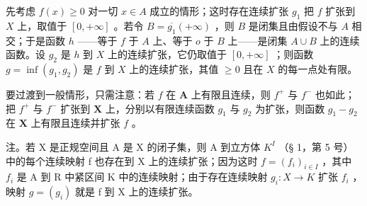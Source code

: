 先考虑 \(f(x) \geqslant 0\) 对一切 \(x \in A\) 成立的情形；这时存在连续扩张 \(g_1\) 把 \(f\) 扩张到 \(X\) 上，取值于 \([0, +\infty]\) 。若令 \(B = \overline{g_1} (+\infty)\) ，则 \(B\) 是闭集且由假设不与 \(A\) 相交；于是函数 \(h\) ——等于 \(f\) 于 \(A\) 上、等于 \(o\) 于 \(B\) 上——是闭集 \(A \cup B\) 上的连续函数。设 \(g_2\) 是 \(h\) 到 \(X\) 上的连续扩张，它仍取值于 \([0, +\infty]\) ；则函数 \(g = \inf(g_1, g_2)\) 是 \(f\) 到 \(X\) 上的连续扩张，其值 \(\geqslant 0\) 且在 \(X\) 的每一点处有限。

要过渡到一般情形，只需注意：若 \(f\) 在 \(\mathbf{A}\) 上有限且连续，则 \(f^{+}\) 与 \(f^{-}\) 也如此；把 \(f^{+}\) 与 \(f^{-}\) 扩张到 \(\mathbf{X}\) 上，分别以有限连续函数 \(g_{1}\) 与 \(g_{2}\) 为扩张，则函数 \(g_{1} - g_{2}\) 在 \(\mathbf{X}\) 上有限且连续并扩张 \(f\) 。

注。若 X 是正规空间且 A 是 X 的闭子集，则 A 到立方体 \(K^{I}\) （§ 1，第 5 号）中的每个连续映射 f 也存在到 X 上的连续扩张；因为这时 \(f = (f_{i})_{i \in I}\) ，其中 \(f_{i}\) 是 A 到 R 中紧区间 K 中的连续映射；由于存在连续映射 \(g_{i}: X \to K\) 扩张 \(f_{i}\) ，映射 \(g = (g_{i})\) 就是 f 到 X 上的连续扩张。

